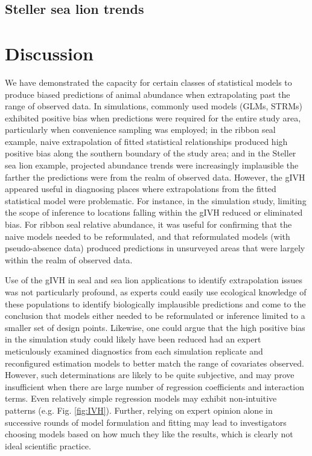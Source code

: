 \documentclass[12pt,english]{article}
\begin{document}
\begin{spacing}{1.9}
\subsection{Steller sea lion trends}




\section{Discussion}

We have demonstrated the capacity for certain classes of statistical models to produce biased predictions of animal abundance when extrapolating past the range of observed data.  In simulations, commonly used models (GLMs, STRMs) exhibited positive bias when predictions were required for the entire study area, particularly when convenience sampling was employed; in the ribbon seal example, naive extrapolation of fitted statistical relationships produced high positive bias along the southern boundary of the study area; and in the Steller sea lion example, projected abundance trends were increasingly implausible the farther the predictions were from the realm of observed data.  However, the gIVH appeared useful in diagnosing places where extrapolations from the fitted statistical model were problematic.  For instance, in the simulation study, limiting the scope of inference to locations falling within the gIVH reduced or eliminated bias.  For ribbon seal relative abundance, it was useful for confirming that the naive models needed to be reformulated, and that reformulated models (with pseudo-absence data) produced predictions in unsurveyed areas that were largely within the realm of observed data.

Use of the gIVH in seal and sea lion applications to identify extrapolation issues was not particularly profound, as experts could easily use ecological knowledge of these populations to identify biologically implausible predictions and come to the conclusion that models either needed to be reformulated or inference limited to a smaller set of design points.  Likewise, one could argue that the high positive bias in the simulation study could likely have been reduced had an expert meticulously examined diagnostics from each simulation replicate and reconfigured estimation models to better match the range of covariates observed. However, such determinations are likely to be quite subjective, and may prove insufficient when there are large number of regression coefficients and interaction terms.  Even relatively simple regression models may exhibit non-intuitive patterns (e.g. Fig. \ref{fig:IVH}).  Further, relying on expert opinion alone in successive rounds of model formulation and fitting may lead to investigators choosing models based on how much they like the results, which is clearly not ideal scientific practice.


\end{spacing}
\end{document}
